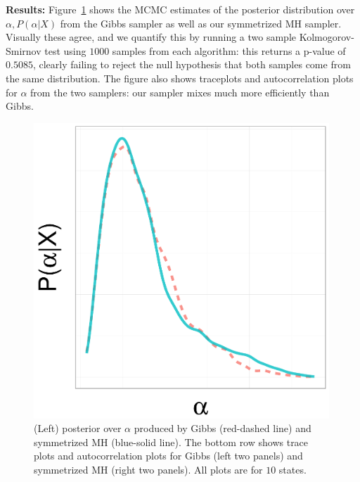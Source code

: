 \noindent \textbf{Results:}
Figure~\ref{fig:TRACE_EXP} shows the MCMC estimates of the posterior distribution over $\alpha, P(\alpha|X)$ from the Gibbs sampler as well as our symmetrized MH sampler. 
Visually these agree, and we quantify this by running a two sample Kolmogorov-Smirnov test using $1000$ samples from each algorithm: this returns a p-value of $0.5085$, clearly failing to reject the null hypothesis that both samples come from the same distribution. 
The figure also shows traceplots and autocorrelation plots for $\alpha$ from the two samplers: our sampler mixes much more efficiently than Gibbs.
  \begin{figure}[H]
  \begin{minipage}[!hp]{0.25\linewidth}
    \includegraphics [width=0.99\textwidth, angle=0]{figs/EXP_ks/exp_hist_44_05_10_.pdf}
  \end{minipage}
  \begin{minipage}[!hp]{0.74\linewidth}
  \caption{(Left) posterior over $\alpha$ produced by Gibbs (red-dashed line) and symmetrized MH (blue-solid line). The bottom row shows trace plots and autocorrelation plots for Gibbs (left two panels) and symmetrized MH (right two panels). All plots are for $10$ states.}
     \label{fig:TRACE_EXP}
  \end{minipage}
  \centering
  \begin{minipage}[!hp]{0.97\linewidth}

\end{minipage}
\end{figure}
